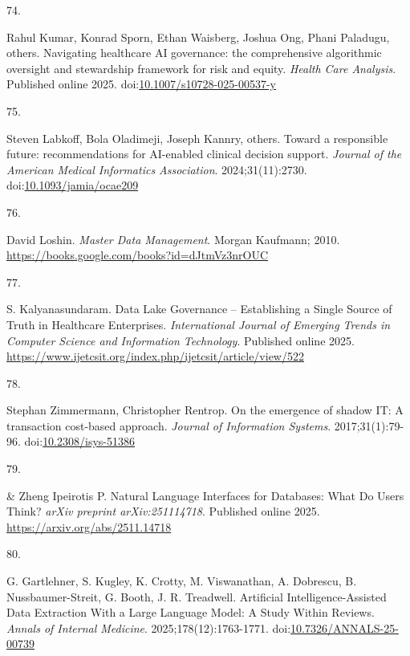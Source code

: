 \documentclass[
  american,
  11pt,
  letterpaper,
  oneside  ,captions=tableheading
]{scrartcl}
\newlength{\cslhangindent}
\newlength{\csllabelwidth}
\newenvironment{CSLReferences}[2] %
 {\begin{list}{}{%
  \setlength{\itemindent}{0pt}
  \setlength{\leftmargin}{0pt}
  \setlength{\parsep}{0pt}
  \ifodd #1
   \setlength{\leftmargin}{\cslhangindent}
   \setlength{\itemindent}{-1\cslhangindent}
  \fi
  \setlength{\itemsep}{#2\baselineskip}}}
 {\end{list}}
\newcommand{\CSLLeftMargin}[1]{\parbox[t]{\csllabelwidth}{\strut#1\strut}}
\newcommand{\CSLRightInline}[1]{\parbox[t]{\linewidth - \csllabelwidth}{\strut#1\strut}}
\begin{document}
\begin{CSLReferences}{0}{1}
\CSLLeftMargin{74. }%
\CSLRightInline{Rahul Kumar, Konrad Sporn, Ethan Waisberg, Joshua Ong,
Phani Paladugu, others. {Navigating healthcare AI governance: the
comprehensive algorithmic oversight and stewardship framework for risk
and equity}. \emph{Health Care Analysis}. Published online 2025.
doi:\href{https://doi.org/10.1007/s10728-025-00537-y}{10.1007/s10728-025-00537-y}}

\CSLLeftMargin{75. }%
\CSLRightInline{Steven Labkoff, Bola Oladimeji, Joseph Kannry, others.
{Toward a responsible future: recommendations for AI-enabled clinical
decision support}. \emph{Journal of the American Medical Informatics
Association}. 2024;31(11):2730.
doi:\href{https://doi.org/10.1093/jamia/ocae209}{10.1093/jamia/ocae209}}

\CSLLeftMargin{76. }%
\CSLRightInline{David Loshin. \emph{{Master Data Management}}. Morgan
Kaufmann; 2010. \url{https://books.google.com/books?id=dJtmVz3nrOUC}}

\CSLLeftMargin{77. }%
\CSLRightInline{S. Kalyanasundaram. {Data Lake Governance --
Establishing a Single Source of Truth in Healthcare Enterprises}.
\emph{International Journal of Emerging Trends in Computer Science and
Information Technology}. Published online 2025.
\url{https://www.ijetcsit.org/index.php/ijetcsit/article/view/522}}

\CSLLeftMargin{78. }%
\CSLRightInline{Stephan Zimmermann, Christopher Rentrop. {On the
emergence of shadow IT: A transaction cost-based approach}.
\emph{Journal of Information Systems}. 2017;31(1):79-96.
doi:\href{https://doi.org/10.2308/isys-51386}{10.2308/isys-51386}}

\CSLLeftMargin{79. }%
\CSLRightInline{\& Zheng Ipeirotis P. {Natural Language Interfaces for
Databases: What Do Users Think?} \emph{arXiv preprint arXiv:251114718}.
Published online 2025. \url{https://arxiv.org/abs/2511.14718}}

\CSLLeftMargin{80. }%
\CSLRightInline{G. Gartlehner, S. Kugley, K. Crotty, M. Viswanathan, A.
Dobrescu, B. Nussbaumer-Streit, G. Booth, J. R. Treadwell. {Artificial
Intelligence-Assisted Data Extraction With a Large Language Model: A
Study Within Reviews}. \emph{Annals of Internal Medicine}.
2025;178(12):1763-1771.
doi:\href{https://doi.org/10.7326/ANNALS-25-00739}{10.7326/ANNALS-25-00739}}


\end{CSLReferences}
\end{document}

